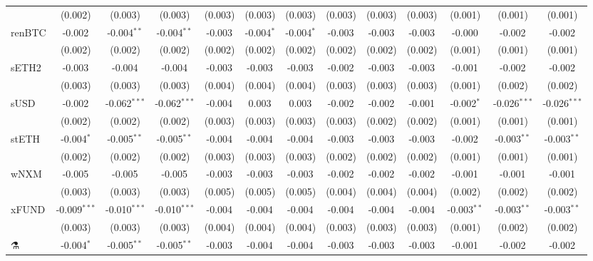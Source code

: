 \begin{table}[!htbp]
\begin{tabular}{@{\extracolsep{5pt}}lcccccccccccc}
  & (0.002) & (0.003) & (0.003) & (0.003) & (0.003) & (0.003) & (0.003) & (0.003) & (0.003) & (0.001) & (0.001) & (0.001) \\
 renBTC & -0.002$^{}$ & -0.004$^{**}$ & -0.004$^{**}$ & -0.003$^{}$ & -0.004$^{*}$ & -0.004$^{*}$ & -0.003$^{}$ & -0.003$^{}$ & -0.003$^{}$ & -0.000$^{}$ & -0.002$^{}$ & -0.002$^{}$ \\
  & (0.002) & (0.002) & (0.002) & (0.002) & (0.002) & (0.002) & (0.002) & (0.002) & (0.002) & (0.001) & (0.001) & (0.001) \\
 sETH2 & -0.003$^{}$ & -0.004$^{}$ & -0.004$^{}$ & -0.003$^{}$ & -0.003$^{}$ & -0.003$^{}$ & -0.002$^{}$ & -0.003$^{}$ & -0.003$^{}$ & -0.001$^{}$ & -0.002$^{}$ & -0.002$^{}$ \\
  & (0.003) & (0.003) & (0.003) & (0.004) & (0.004) & (0.004) & (0.003) & (0.003) & (0.003) & (0.001) & (0.002) & (0.002) \\
 sUSD & -0.002$^{}$ & -0.062$^{***}$ & -0.062$^{***}$ & -0.004$^{}$ & 0.003$^{}$ & 0.003$^{}$ & -0.002$^{}$ & -0.002$^{}$ & -0.001$^{}$ & -0.002$^{*}$ & -0.026$^{***}$ & -0.026$^{***}$ \\
  & (0.002) & (0.002) & (0.002) & (0.003) & (0.003) & (0.003) & (0.003) & (0.002) & (0.002) & (0.001) & (0.001) & (0.001) \\
 stETH & -0.004$^{*}$ & -0.005$^{**}$ & -0.005$^{**}$ & -0.004$^{}$ & -0.004$^{}$ & -0.004$^{}$ & -0.003$^{}$ & -0.003$^{}$ & -0.003$^{}$ & -0.002$^{}$ & -0.003$^{**}$ & -0.003$^{**}$ \\
  & (0.002) & (0.002) & (0.002) & (0.003) & (0.003) & (0.003) & (0.002) & (0.002) & (0.002) & (0.001) & (0.001) & (0.001) \\
 wNXM & -0.005$^{}$ & -0.005$^{}$ & -0.005$^{}$ & -0.003$^{}$ & -0.003$^{}$ & -0.003$^{}$ & -0.002$^{}$ & -0.002$^{}$ & -0.002$^{}$ & -0.001$^{}$ & -0.001$^{}$ & -0.001$^{}$ \\
  & (0.003) & (0.003) & (0.003) & (0.005) & (0.005) & (0.005) & (0.004) & (0.004) & (0.004) & (0.002) & (0.002) & (0.002) \\
 xFUND & -0.009$^{***}$ & -0.010$^{***}$ & -0.010$^{***}$ & -0.004$^{}$ & -0.004$^{}$ & -0.004$^{}$ & -0.004$^{}$ & -0.004$^{}$ & -0.004$^{}$ & -0.003$^{**}$ & -0.003$^{**}$ & -0.003$^{**}$ \\
  & (0.003) & (0.003) & (0.003) & (0.004) & (0.004) & (0.004) & (0.003) & (0.003) & (0.003) & (0.001) & (0.002) & (0.002) \\
 ⚗️ & -0.004$^{*}$ & -0.005$^{**}$ & -0.005$^{**}$ & -0.003$^{}$ & -0.004$^{}$ & -0.004$^{}$ & -0.003$^{}$ & -0.003$^{}$ & -0.003$^{}$ & -0.001$^{}$ & -0.002$^{}$ & -0.002$^{}$ \\

\end{tabular}
\end{table}
